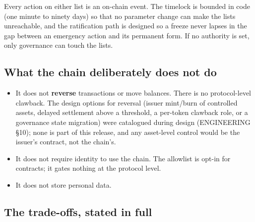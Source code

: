 Every action on either list is an on-chain event. The timelock is bounded in
code (one minute to ninety days) so that no parameter change can make the
lists unreachable, and the ratification path is designed so a freeze never
lapses in the gap between an emergency action and its permanent form. If no
authority is set, only governance can touch the lists.


\subsection{What the chain deliberately does not do}

\begin{itemize}
\item It does not \textbf{reverse} transactions or move balances. There is no
  protocol-level clawback. The design options for reversal (issuer mint/burn of
  controlled assets, delayed settlement above a threshold, a per-token clawback
  role, or a governance state migration) were catalogued during design
  (ENGINEERING \S10); none is part of this release, and any asset-level control
  would be the issuer's contract, not the chain's.
\item It does not require identity to use the chain. The allowlist is opt-in for
  contracts; it gates nothing at the protocol level.
\item It does not store personal data. 
\end{itemize}

\subsection{The trade-offs, stated in full}
\label{sec:compliancerisks}

